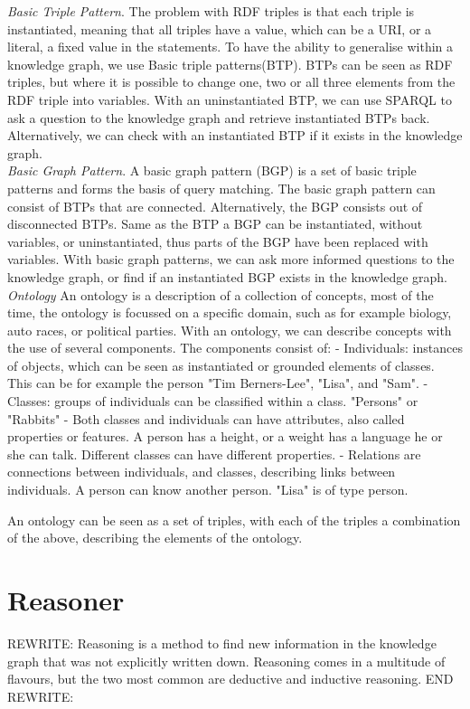 \documentclass[11pt,letterpaper ,oneside ]{book}
\begin{document}
	\textit{Basic Triple Pattern}. The problem with RDF triples is that each triple is instantiated, meaning that all triples have a value, which can be a URI, or a literal,  a fixed value in the statements. 
	To have the ability to generalise within a knowledge graph, we use Basic triple patterns(BTP). BTPs can be seen as RDF triples, but where it is possible to change one, two or all three elements from the RDF triple into variables. With an uninstantiated BTP, we can use SPARQL to ask a question to the knowledge graph and retrieve instantiated BTPs back. Alternatively, we can check with an instantiated BTP if it exists in the knowledge graph.\\
	
	\textit{Basic Graph Pattern}. A basic graph pattern (BGP) is a set of basic triple patterns and forms the basis of query matching. The basic graph pattern
	can consist of BTPs that are connected.
	Alternatively, the BGP consists out of disconnected BTPs. Same as the BTP a BGP can be instantiated, without variables, or uninstantiated, thus parts of the BGP have been replaced with variables. With basic graph patterns, we can ask more informed questions to the knowledge graph, or find if an instantiated BGP exists in the knowledge graph.\\
	
	\textit{Ontology} An ontology is a description of a collection of concepts, most of the time, the ontology is focussed on a specific domain, such as for example biology, auto races, or political parties. With an ontology, we can describe concepts with the use of several components. The components consist of:
	- Individuals: instances of objects, which can be seen as instantiated or grounded elements of classes. This can be for example the person "Tim Berners-Lee", "Lisa", and "Sam".
	- Classes: groups of individuals can be classified within a class. "Persons" or "Rabbits"
	- Both classes and individuals can have attributes, also called properties or features. A person has a height, or a weight has a language he or she can talk. Different classes can have different properties. 
	- Relations are connections between individuals, and classes, describing links between individuals. A person can know another person. "Lisa" is of type person. 
	
	An ontology can be seen as a set of triples, with each of the triples a combination of the above, describing the elements of the ontology.
	
	\section{Reasoner}
	REWRITE:
	Reasoning is a method to find new information in the knowledge graph that was not explicitly written down. Reasoning comes in a multitude of flavours, but the two most common are deductive and inductive reasoning. 
	END REWRITE:
	
\end{document}
